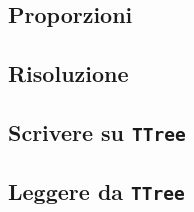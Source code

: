 \documentclass{article}
\begin{document}
\subsection{Proporzioni}


\subsection{Risoluzione}


\subsection{Scrivere su \texttt{TTree}}


\subsection{Leggere da \texttt{TTree}}

\end{document}
